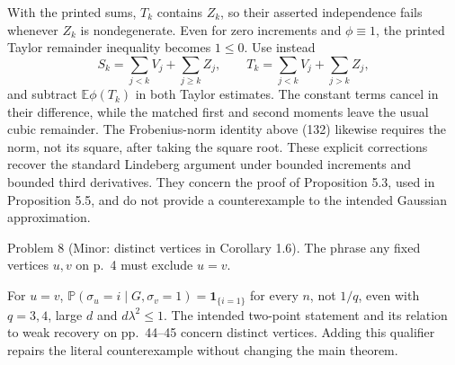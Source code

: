 \documentclass[10pt]{article}
\begin{document}
With the printed sums, \(T_k\) contains \(Z_k\), so their asserted independence fails whenever \(Z_k\) is nondegenerate. Even for zero increments and \(\phi\equiv1\), the printed Taylor remainder inequality becomes \(1\leq0\). Use instead \[S_k=\sum_{j<k}V_j+\sum_{j\geq k}Z_j,\qquad
 T_k=\sum_{j<k}V_j+\sum_{j>k}Z_j,\] and subtract \(\mathbb E\phi(T_k)\) in both Taylor estimates. The constant terms cancel in their difference, while the matched first and second moments leave the usual cubic remainder. The Frobenius-norm identity above (132) likewise requires the norm, not its square, after taking the square root. These explicit corrections recover the standard Lindeberg argument under bounded increments and bounded third derivatives. They concern the proof of Proposition 5.3, used in Proposition 5.5, and do not provide a counterexample to the intended Gaussian approximation.\par
Problem 8 (Minor: distinct vertices in Corollary 1.6).  The phrase any fixed vertices \(u,v\) on p. 4 must exclude \(u=v\).\par
For \(u=v\), \(\mathbb P(\sigma_u=i\mid G,\sigma_v=1)=\mathbf1_{\{i=1\}}\) for every \(n\), not \(1/q\), even with \(q=3,4\), large \(d\) and \(d\lambda^2\leq1\). The intended two-point statement and its relation to weak recovery on pp. 44–45 concern distinct vertices. Adding this qualifier repairs the literal counterexample without changing the main theorem.\par
\end{document}
